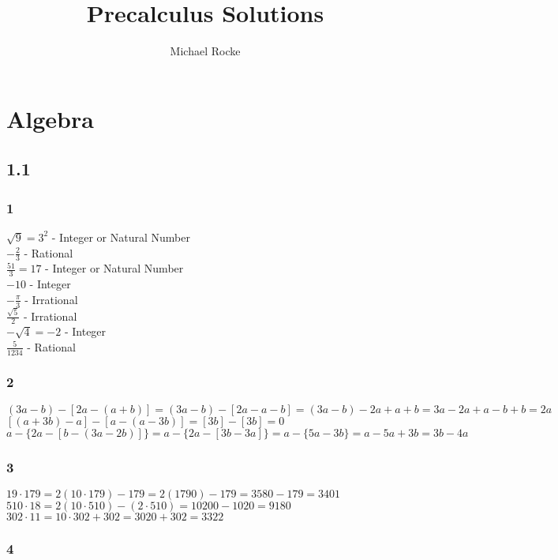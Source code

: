 \documentclass[]{report}
\title{Precalculus Solutions}
\author{Michael Rocke}
\begin{document}
\maketitle

\section{Algebra}

\subsection{1.1}

\subsubsection{1}
$\sqrt{9} = 3^2$ - Integer or Natural Number\\
$-\frac{2}{3}$ - Rational \\
$ \frac{51}{3} = 17 $ - Integer or Natural Number \\
$ -10 $ - Integer \\
$ -\frac{\pi}{3} $ - Irrational \\
$ \frac{\sqrt{5}}{2} $ - Irrational \\
$ - \sqrt{4} = -2 $ - Integer \\
$ \frac{5}{1234} $ - Rational 

\subsubsection{2}
$ (3a - b)  - [2a - (a + b)] = (3a - b) - [2a - a - b] = (3a - b) - 2a + a + b = 3a - 2a + a - b + b = 2a $ \\
$ [(a + 3b) -a] - [a - (a - 3b)] =  [3b] -  [3b] = 0 $ \\
$ a - \{2a - [b - (3a - 2b)]\} = a  - \{2a - [3b - 3a]\} = a  - \{5a - 3b\} = a - 5a + 3b = 3b - 4a $

\subsubsection{3}
$ 19 \cdot 179 = 2(10 \cdot 179) - 179 = 2(1790) - 179 = 3580 - 179 = 3401 $ \\
$ 510 \cdot 18 = 2(10 \cdot 510) - (2 \cdot 510) = 10200 - 1020 = 9180 $ \\
$ 302 \cdot 11 = 10\cdot 302 + 302 = 3020 + 302 = 3322 $ \\

\subsubsection{4}
\end{document}
